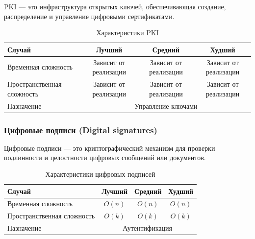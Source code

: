 \documentclass[a4paper,12pt]{article}
\begin{document}
PKI --- это инфраструктура открытых ключей, обеспечивающая создание, распределение и управление цифровыми сертификатами.

\begin{table}[H]
    \centering
    \begin{tabular}{|l|c|c|c|}
        \hline
        Случай & Лучший & Средний & Худший \\
        \hline
        Временная сложность & Зависит от реализации & Зависит от реализации & Зависит от реализации \\
        \hline
        Пространственная сложность & Зависит от реализации & Зависит от реализации & Зависит от реализации \\
        \hline
        Назначение & \multicolumn{3}{c|}{Управление ключами} \\
        \hline
    \end{tabular}
    \caption{Характеристики PKI}
\end{table}

\subsubsection{Цифровые подписи (Digital signatures)}
\label{subsubsec:цифровые-подписи-digital-signatures}

Цифровые подписи --- это криптографический механизм для проверки подлинности и целостности цифровых сообщений или документов.

\begin{table}[H]
    \centering
    \begin{tabular}{|l|c|c|c|}
        \hline
        Случай & Лучший & Средний & Худший \\
        \hline
        Временная сложность & $O(n)$ & $O(n)$ & $O(n)$ \\
        \hline
        Пространственная сложность & $O(k)$ & $O(k)$ & $O(k)$ \\
        \hline
        Назначение & \multicolumn{3}{c|}{Аутентификация} \\
        \hline
    \end{tabular}
    \caption{Характеристики цифровых подписей}
\end{table}
\end{document}
